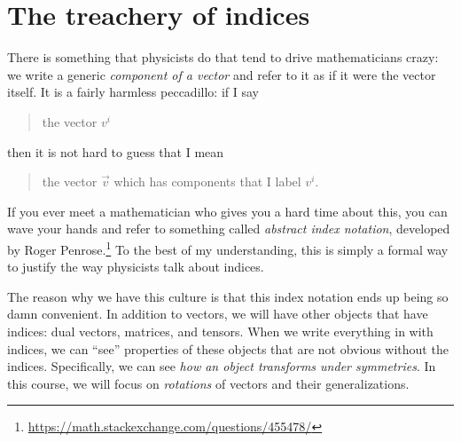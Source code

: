 \documentclass[12pt, oneside]{report}    %
\let\oldsection\section
\def\section{%
  \setcounter{sidenote}{1}%
  \oldsection
}
\begin{document}
\section{The treachery of indices}
\label{sec:treachery:of:indices:vi:is:not:a:vector}

There is something that physicists do that tend to drive mathematicians crazy: we write a generic \emph{component of a vector} and refer to it as if it were the vector itself. It is a fairly harmless peccadillo: if I say
\begin{quote}
the vector $v^i$
\end{quote}
then it is not hard to guess that I mean
\begin{quote}
the vector $\vec{v}$ which has components that I label $v^i$.
\end{quote}
If you ever meet a mathematician who gives you a hard time about this, you can wave your hands and refer to something called \emph{abstract index notation}, developed by Roger Penrose.\footnote{\url{https://math.stackexchange.com/questions/455478/}} To the best of my understanding, this is simply a formal way to justify the way physicists talk about indices. 

The reason why we have this culture is that this index notation ends up being so damn convenient. In addition to vectors, we will have other objects that have indices: dual vectors, matrices, and tensors. When we write everything in with indices, we can ``see'' properties of these objects that are not obvious without the indices. Specifically, we can see \emph{how an object transforms under symmetries}. In this course, we will focus on \emph{rotations} of vectors and their generalizations. 
\end{document}
